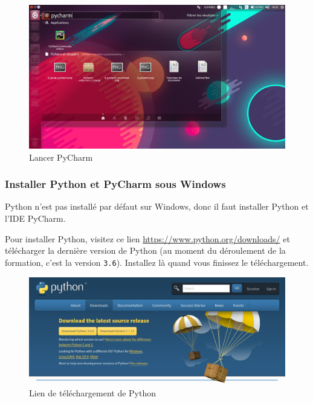 \documentclass[12pt]{article}
\newcommand{\code}[1]{\colorbox{light-gray}{\texttt{#1}}}
\begin{document}
            \begin{figure}[H]
                \centering
                \includegraphics[width=\linewidth]{img/8_lancer_pycharm.png}
                \caption{Lancer PyCharm}
                \label{launch_pycharm}
            \end{figure}
        \subsubsection{Installer Python et PyCharm sous Windows}
            Python n'est pas installé par défaut sur Windows, donc il faut installer Python et l'IDE PyCharm.

            Pour installer Python, visitez ce lien 
            \href{https://www.python.org/downloads/}{https://www.python.org/downloads/} et télécharger la 
            dernière version de Python (au moment du déroulement de la formation, c'est la version \code{3.6}).
            Installez là quand vous finissez le téléchargement.

            \begin{figure}[H]
                \centering
                \includegraphics[width=\linewidth]{img/8_python_download.png}
                \caption{Lien de téléchargement de Python}
            \end{figure}
\end{document}
